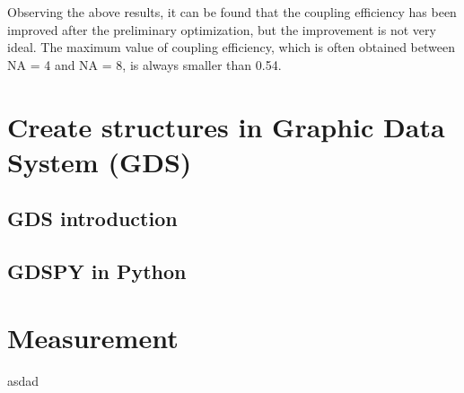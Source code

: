 \documentclass[]{article}
\begin{document}
Observing the above results, it can be found that the coupling efficiency has been improved after the preliminary optimization, but the improvement is not very ideal. The maximum value of coupling efficiency, which is often obtained between NA = 4 and NA = 8, is always smaller than 0.54.


\section{Create structures in Graphic Data System (GDS)}


\subsection{GDS introduction}

\subsection{GDSPY in Python}

\section{Measurement}

\newpage

\begin{thebibliography}{99}
asdad
\end{thebibliography}
\end{document}
